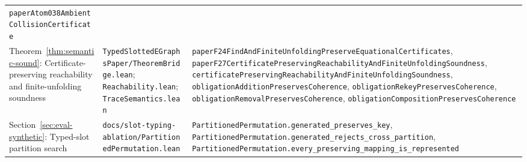 \begin{table}[ht]
\begin{tabular}{@{}%
>{\raggedright\arraybackslash}p{3.0cm}%
>{\raggedright\arraybackslash}p{3.0cm}%
>{\raggedright\arraybackslash}p{5.75cm}@{}}
\texttt{paperAtom038Ambient\allowbreak CollisionCertificate}\\[4pt]
Theorem~\ref{thm:semantic-sound}: Certificate-preserving reachability and finite-unfolding soundness &
\texttt{TypedSlottedEGraphs\allowbreak Paper/\allowbreak TheoremBridge.lean};
\texttt{Reachability.lean}; \texttt{TraceSemantics.lean} &
\texttt{paperF24FindAndFinite\allowbreak UnfoldingPreserve\allowbreak EquationalCertificates},
\texttt{paperF27CertificatePreserving\allowbreak ReachabilityAndFinite\allowbreak UnfoldingSoundness},
\texttt{certificatePreserving\allowbreak ReachabilityAndFinite\allowbreak UnfoldingSoundness},
\texttt{obligationAddition\allowbreak PreservesCoherence},
\texttt{obligationRekey\allowbreak PreservesCoherence},
\texttt{obligationRemoval\allowbreak PreservesCoherence},
\texttt{obligationComposition\allowbreak PreservesCoherence}\\[4pt]
Section~\ref{sec:eval-synthetic}: Typed-slot partition search &
\texttt{docs/slot-typing-\allowbreak ablation/\allowbreak Partitioned\allowbreak Permutation.lean} &
\texttt{PartitionedPermutation.\allowbreak generated\_\allowbreak preserves\_\allowbreak key},
\texttt{PartitionedPermutation.\allowbreak generated\_\allowbreak rejects\_\allowbreak cross\_\allowbreak partition},
\texttt{PartitionedPermutation.\allowbreak every\_\allowbreak preserving\_\allowbreak mapping\_\allowbreak is\_\allowbreak represented}\\
\bottomrule
\end{tabular}
\end{table}

